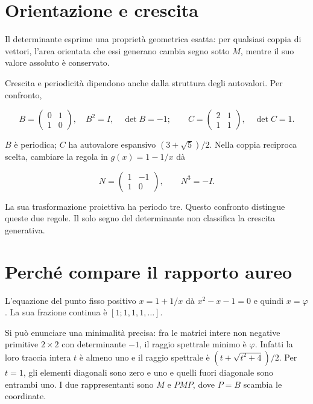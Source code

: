 \documentclass[10pt,a4paper]{article}
\begin{document}
\section*{Orientazione e crescita}

Il determinante esprime una proprietà geometrica esatta: per qualsiasi coppia di vettori, l'area orientata che essi generano cambia segno sotto $M$, mentre il suo valore assoluto è conservato.
\par

Crescita e periodicità dipendono anche dalla struttura degli autovalori. Per confronto,
\par

\[
B=\begin{pmatrix}0&1\\1&0\end{pmatrix},\quad B^2=I,\quad \det B=-1;\qquad C=\begin{pmatrix}2&1\\1&1\end{pmatrix},\quad \det C=1.
\]

$B$ è periodica; $C$ ha autovalore espansivo $(3+\sqrt5)/2$. Nella coppia reciproca scelta, cambiare la regola in $g(x)=1-1/x$ dà
\par

\[
N=\begin{pmatrix}1&-1\\1&0\end{pmatrix},\qquad N^3=-I.
\]

La sua trasformazione proiettiva ha periodo tre. Questo confronto distingue queste due regole. Il solo segno del determinante non classifica la crescita generativa.
\par

\section*{Perché compare il rapporto aureo}

L'equazione del punto fisso positivo $x=1+1/x$ dà $x^2-x-1=0$ e quindi $x=\varphi$. La sua frazione continua è $[1;1,1,1,\ldots]$.
\par

Si può enunciare una minimalità precisa: fra le matrici intere non negative primitive $2\times2$ con determinante $-1$, il raggio spettrale minimo è $\varphi$. Infatti la loro traccia intera $t$ è almeno uno e il raggio spettrale è $(t+\sqrt{t^2+4})/2$. Per $t=1$, gli elementi diagonali sono zero e uno e quelli fuori diagonale sono entrambi uno. I due rappresentanti sono $M$ e $PMP$, dove $P=B$ scambia le coordinate.
\par
\end{document}
